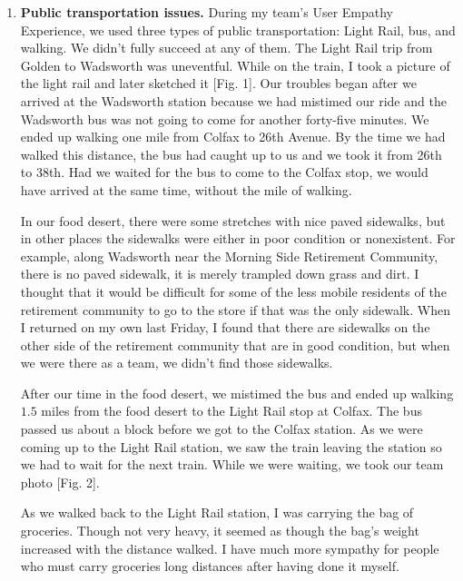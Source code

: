 \documentclass[11pt]{article}
\begin{document}
\begin{enumerate}
    \item \textbf{Public transportation issues.} During my team's User Empathy Experience, we
        used three types of public transportation: Light Rail, bus, and walking. We didn't fully
        succeed at any of them. The Light Rail trip from Golden to Wadsworth was uneventful. While
        on the train, I took a picture of the light rail and later sketched it [Fig. 1]. Our
        troubles began after we arrived at the Wadsworth station because we had mistimed our ride
        and the Wadsworth bus was not going to come for another forty-five minutes. We ended up
        walking one mile from Colfax to 26th Avenue. By the time we had walked this distance, the
        bus had caught up to us and we took it from 26th to 38th. Had we waited for the bus to come
        to the Colfax stop, we would have arrived at the same time, without the mile of walking.

        In our food desert, there were some stretches with nice paved sidewalks, but in other
        places the sidewalks were either in poor condition or nonexistent. For example, along
        Wadsworth near the Morning Side Retirement Community, there is no paved sidewalk, it is
        merely trampled down grass and dirt. I thought that it would be difficult for some of the
        less mobile residents of the retirement community to go to the store if that was the only
        sidewalk. When I returned on my own last Friday, I found that there are sidewalks on the
        other side of the retirement community that are in good condition, but when we were there as
        a team, we didn't find those sidewalks.

        After our time in the food desert, we mistimed the bus and ended up walking $1.5$ miles from
        the food desert to the Light Rail stop at Colfax. The bus passed us about a block before we
        got to the Colfax station. As we were coming up to the Light Rail station, we saw the train
        leaving the station so we had to wait for the next train. While we were waiting, we took our
        team photo [Fig. 2].

        As we walked back to the Light Rail station, I was carrying the bag of groceries. Though not
        very heavy, it seemed as though the bag's weight increased with the distance walked. I have
        much more sympathy for people who must carry groceries long distances after having done it
        myself.


\end{enumerate}
\end{document}

